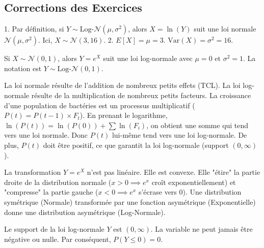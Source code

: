 
\subsection{Corrections des Exercices}

\begin{correctionbox}
1.  Par définition, si $Y \sim \text{Log-}\mathcal{N}(\mu, \sigma^2)$, alors $X = \ln(Y)$ suit une loi normale $\mathcal{N}(\mu, \sigma^2)$.
    Ici, $X \sim \mathcal{N}(3, 16)$.
2.  $E[X] = \mu = 3$.
    $\text{Var}(X) = \sigma^2 = 16$.
\end{correctionbox}

\begin{correctionbox}
Si $X \sim \mathcal{N}(0, 1)$, alors $Y = e^X$ suit une loi log-normale avec $\mu=0$ et $\sigma^2=1$.
La notation est $Y \sim \text{Log-}\mathcal{N}(0, 1)$.
\end{correctionbox}

\begin{correctionbox}
La loi normale résulte de l'addition de nombreux petits effets (TCL).
La loi log-normale résulte de la multiplication de nombreux petits facteurs.
La croissance d'une population de bactéries est un processus multiplicatif ($P(t) = P(t-1) \times F_t$).
En prenant le logarithme, $\ln(P(t)) = \ln(P(0)) + \sum \ln(F_i)$, on obtient une somme qui tend vers une loi normale. Donc $P(t)$ lui-même tend vers une loi log-normale.
De plus, $P(t)$ doit être positif, ce que garantit la loi log-normale (support $(0, \infty)$).
\end{correctionbox}

\begin{correctionbox}
La transformation $Y = e^X$ n'est pas linéaire. Elle est convexe.
Elle "étire" la partie droite de la distribution normale ($x>0 \implies e^x$ croît exponentiellement) et "compresse" la partie gauche ($x<0 \implies e^x$ s'écrase vers 0).
Une distribution symétrique (Normale) transformée par une fonction asymétrique (Exponentielle) donne une distribution asymétrique (Log-Normale).
\end{correctionbox}

\begin{correctionbox}
Le support de la loi log-normale $Y$ est $(0, \infty)$. La variable ne peut jamais être négative ou nulle.
Par conséquent, $P(Y \le 0) = 0$.
\end{correctionbox}

